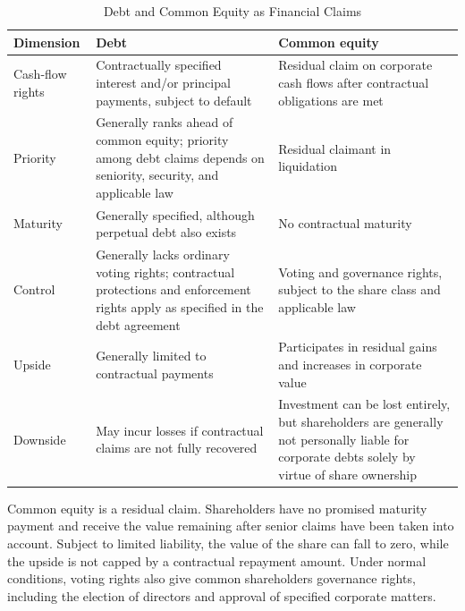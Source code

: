 \begin{table}[htbp]
\centering

\caption{Debt and Common Equity as Financial Claims}
\label{tab:ch9-debt-equity-claims}

\begin{tabularx}{\textwidth}{@{}p{3.0cm}Y Y@{}}

\toprule

\textbf{Dimension}
& \textbf{Debt}
& \textbf{Common equity} \\

\midrule

Cash-flow rights
& Contractually specified interest and/or principal payments, subject to default
& Residual claim on corporate cash flows after contractual obligations are met \\

Priority
& Generally ranks ahead of common equity; priority among debt claims depends on seniority, security, and applicable law
& Residual claimant in liquidation \\

Maturity
& Generally specified, although perpetual debt also exists
& No contractual maturity \\

Control
& Generally lacks ordinary voting rights; contractual protections and enforcement rights apply as specified in the debt agreement
& Voting and governance rights, subject to the share class and applicable law \\

Upside
& Generally limited to contractual payments
& Participates in residual gains and increases in corporate value \\

Downside
& May incur losses if contractual claims are not fully recovered
& Investment can be lost entirely, but shareholders are generally not personally liable for corporate debts solely by virtue of share ownership \\

\bottomrule

\end{tabularx}

\end{table}

Common equity is a residual claim. Shareholders have no promised maturity payment and receive the value remaining after senior claims have been taken into account. Subject to limited liability, the value of the share can fall to zero, while the upside is not capped by a contractual repayment amount. Under normal conditions, voting rights also give common shareholders governance rights, including the election of directors and approval of specified corporate matters.

